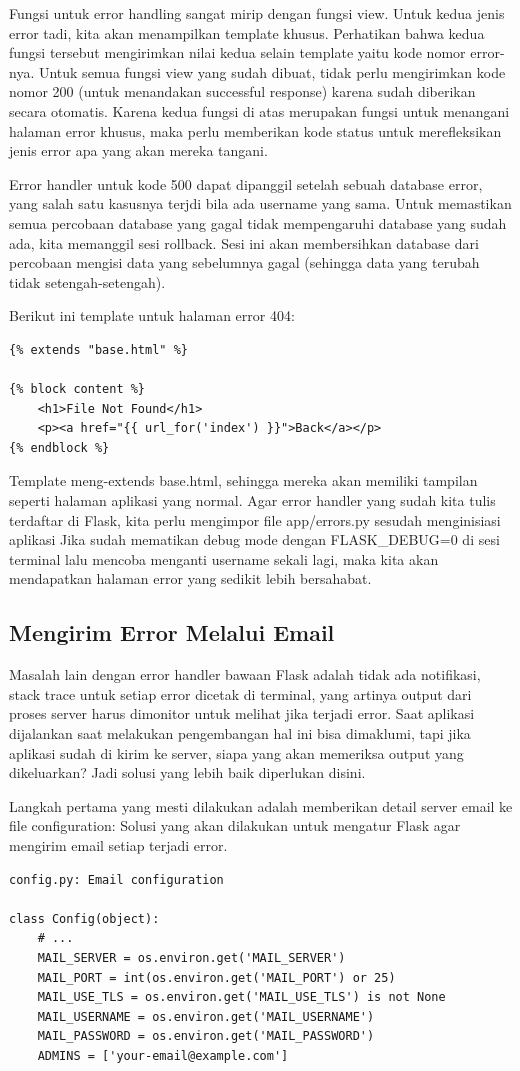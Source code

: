 Fungsi untuk error handling sangat mirip dengan fungsi view. Untuk kedua jenis error tadi, kita akan menampilkan template khusus. Perhatikan bahwa kedua fungsi tersebut mengirimkan nilai kedua selain template yaitu kode nomor error-nya. Untuk semua fungsi view yang sudah dibuat, tidak perlu mengirimkan kode nomor 200 (untuk menandakan successful response) karena sudah diberikan secara otomatis.
Karena kedua fungsi di atas merupakan fungsi untuk menangani halaman error khusus, maka  perlu memberikan kode status untuk merefleksikan jenis error apa yang akan mereka tangani.

Error handler untuk kode 500 dapat dipanggil setelah sebuah database error, yang salah satu kasusnya terjdi bila ada username yang sama. Untuk memastikan semua percobaan database yang gagal tidak mempengaruhi database yang sudah ada, kita memanggil sesi rollback. Sesi ini akan membersihkan database dari percobaan mengisi data yang sebelumnya gagal (sehingga data yang terubah tidak setengah-setengah).

Berikut ini template untuk halaman error 404:
\begin{verbatim}
{% extends "base.html" %}

{% block content %}
    <h1>File Not Found</h1>
    <p><a href="{{ url_for('index') }}">Back</a></p>
{% endblock %}
 \end{verbatim}
Template meng-extends base.html, sehingga mereka akan memiliki tampilan seperti halaman aplikasi yang normal. 
Agar error handler yang sudah kita tulis terdaftar di Flask, kita perlu mengimpor file app/errors.py sesudah menginisiasi aplikasi
Jika sudah mematikan debug mode dengan FLASK_DEBUG=0 di sesi terminal lalu mencoba menganti username sekali lagi, maka kita akan mendapatkan halaman error yang sedikit lebih bersahabat.


\subsection{Mengirim Error Melalui Email}
Masalah lain dengan error handler bawaan Flask adalah tidak ada notifikasi, stack trace untuk setiap error dicetak di terminal, yang artinya output dari proses server harus dimonitor untuk melihat jika terjadi error. Saat aplikasi dijalankan saat melakukan pengembangan hal ini bisa dimaklumi, tapi jika aplikasi sudah di kirim ke server, siapa yang akan memeriksa output yang dikeluarkan? Jadi solusi yang lebih baik diperlukan disini.

Langkah pertama yang mesti dilakukan adalah memberikan detail server email ke file configuration:
Solusi yang akan dilakukan untuk mengatur Flask agar mengirim email setiap terjadi error.
\begin{verbatim}
config.py: Email configuration

class Config(object):
    # ...
    MAIL_SERVER = os.environ.get('MAIL_SERVER')
    MAIL_PORT = int(os.environ.get('MAIL_PORT') or 25)
    MAIL_USE_TLS = os.environ.get('MAIL_USE_TLS') is not None
    MAIL_USERNAME = os.environ.get('MAIL_USERNAME')
    MAIL_PASSWORD = os.environ.get('MAIL_PASSWORD')
    ADMINS = ['your-email@example.com']
    \end{verbatim} 
    
